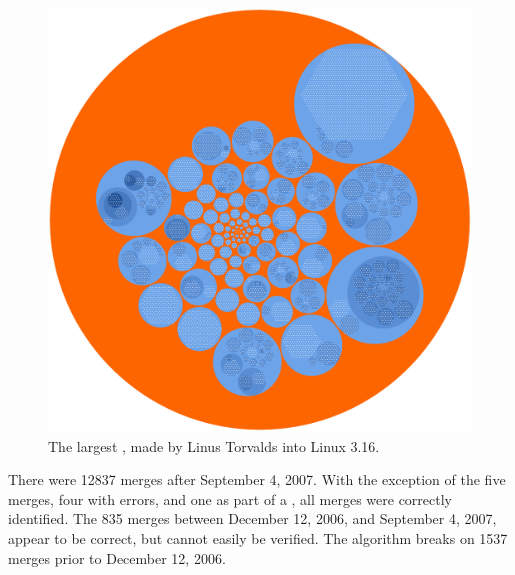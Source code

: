 \begin{figure}[htpb]
  \centering
  \includegraphics[width=0.8\linewidth]{Figures/model/big_tree.pdf}
  \caption{The largest \mt{}, made by Linus Torvalds into Linux 3.16.}
  \label{fig:big_tree}
\end{figure}

There were 12837 merges after September 4, 2007. With the exception of
the five merges, four with errors, and one as part of a \foxtrot{}, all
merges were correctly identified. The 835 merges between December 12,
2006, and September 4, 2007, appear to be correct, but cannot easily be
verified. The algorithm breaks on 1537 merges prior to December 12,
2006.

